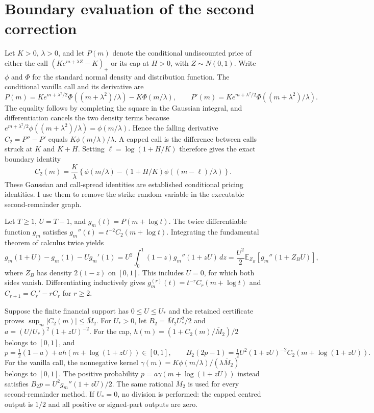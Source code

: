 \section{Boundary evaluation of the second correction}
Let $K>0$, $\lambda>0$, and let $P(m)$ denote the conditional undiscounted price of either the call $(K e^{m+\lambda Z}-K)_+$ or its cap at $H>0$, with $Z\sim N(0,1)$. Write $\phi$ and $\Phi$ for the standard normal density and distribution function. The conditional vanilla call and its derivative are
\[
 P(m)=K e^{m+\lambda^2/2}\Phi((m+\lambda^2)/\lambda)-K\Phi(m/\lambda),\qquad
 P'(m)=K e^{m+\lambda^2/2}\Phi((m+\lambda^2)/\lambda).
\]
The equality follows by completing the square in the Gaussian integral, and differentiation cancels the two density terms because $e^{m+\lambda^2/2}\phi((m+\lambda^2)/\lambda)=\phi(m/\lambda)$. Hence the falling derivative $C_2=P''-P'$ equals $K\phi(m/\lambda)/\lambda$. A capped call is the difference between calls struck at $K$ and $K+H$. Setting $\ell=\log(1+H/K)$ therefore gives the exact boundary identity
\[
 C_2(m)=\frac K\lambda\left\{\phi(m/\lambda)-(1+H/K)\phi((m-\ell)/\lambda)\right\}.
\]
These Gaussian and call-spread identities are established conditional pricing identities. I use them to remove the strike random variable in the executable second-remainder graph.

Let $T\geq1$, $U=T-1$, and $g_m(t)=P(m+\log t)$. The twice differentiable function $g_m$ satisfies $g_m''(t)=t^{-2}C_2(m+\log t)$. Integrating the fundamental theorem of calculus twice yields
\[
 g_m(1+U)-g_m(1)-Ug_m'(1)=U^2\int_0^1(1-z)g_m''(1+zU)\,dz
 =\frac{U^2}{2}\mathbb E_{Z_B}[g_m''(1+Z_B U)],
\]
where $Z_B$ has density $2(1-z)$ on $[0,1]$. This includes $U=0$, for which both sides vanish. Differentiating inductively gives $g_m^{(r)}(t)=t^{-r}C_r(m+\log t)$ and $C_{r+1}=C_r'-rC_r$ for $r\geq2$.

Suppose the finite financial support has $0\leq U\leq U_*$ and the retained certificate proves $\sup_m|C_2(m)|\leq\overline M_2$. For $U_*>0$, let $B_2=\overline M_2 U_*^2/2$ and $a=(U/U_*)^2(1+zU)^{-2}$. For the cap, $h(m)=(1+C_2(m)/\overline M_2)/2$ belongs to $[0,1]$, and
\[
 p=\tfrac12(1-a)+ah(m+\log(1+zU))\in[0,1],\qquad
 B_2(2p-1)=\tfrac12U^2(1+zU)^{-2}C_2(m+\log(1+zU)).
\]
For the vanilla call, the nonnegative kernel $\gamma(m)=K\phi(m/\lambda)/(\lambda\overline M_2)$ belongs to $[0,1]$. The positive probability $p=a\gamma(m+\log(1+zU))$ instead satisfies $B_2p=U^2g_m''(1+zU)/2$. The same rational $\overline M_2$ is used for every second-remainder method. If $U_*=0$, no division is performed: the capped centred output is $1/2$ and all positive or signed-part outputs are zero.

